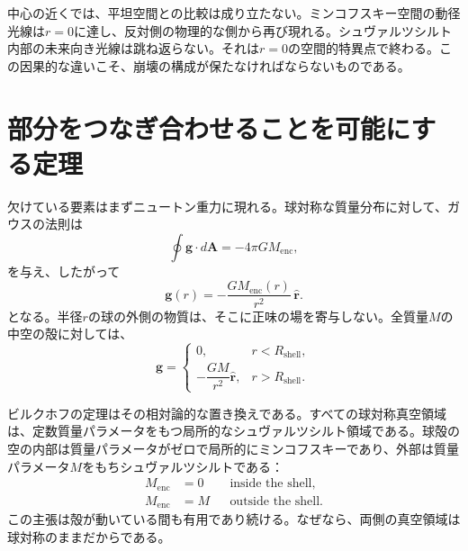 中心の近くでは、平坦空間との比較は成り立たない。ミンコフスキー空間の動径光線は\(r=0\)に達し、反対側の物理的な側から再び現れる。シュヴァルツシルト内部の未来向き光線は跳ね返らない。それは\(r=0\)の空間的特異点で終わる。この因果的な違いこそ、崩壊の構成が保たなければならないものである。

\section{部分をつなぎ合わせることを可能にする定理}

欠けている要素はまずニュートン重力に現れる。球対称な質量分布に対して、ガウスの法則は
\begin{equation}
\oint\mathbf g\cdot d\mathbf A=-4\pi G M_{\mathrm{enc}},
\end{equation}
を与え、したがって
\begin{equation}
\mathbf g(r)=-\frac{G M_{\mathrm{enc}}(r)}{r^2}\,\hat{\mathbf r}.
\label{eq:l05-shell-theorem}
\end{equation}
となる。半径\(r\)の球の外側の物質は、そこに正味の場を寄与しない。全質量\(M\)の中空の殻に対しては、
\begin{equation}
\mathbf g=
\begin{cases}
0, & r<R_{\mathrm{shell}},\\[3pt]
-\dfrac{GM}{r^2}\hat{\mathbf r}, & r>R_{\mathrm{shell}}.
\end{cases}
\end{equation}

ビルクホフの定理はその相対論的な置き換えである。すべての球対称真空領域は、定数質量パラメータをもつ局所的なシュヴァルツシルト領域である。球殻の空の内部は質量パラメータがゼロで局所的にミンコフスキーであり、外部は質量パラメータ\(M\)をもちシュヴァルツシルトである：
\begin{equation}
\begin{aligned}
M_{\mathrm{enc}}&=0 && \text{inside the shell},\\
M_{\mathrm{enc}}&=M && \text{outside the shell}.
\end{aligned}
\label{eq:l05-birkhoff}
\end{equation}
この主張は殻が動いている間も有用であり続ける。なぜなら、両側の真空領域は球対称のままだからである。


